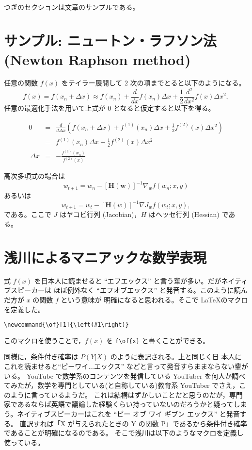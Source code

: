 ﻿\documentclass[uplatex,10pt,a4paper]{jsarticle}
\newcommand{\mb}[1]{\mathbf{#1}}
\newcommand{\of}[1]{\left(#1\right)}
\newcommand{\given}[1]{\left|{#1}\right.}
\newcommand{\Brc}[1]{\left(#1\right)}
\newcommand{\BRc}[1]{\left[{#1}\right]}
\begin{document}
つぎのセクションは文章のサンプルである。

\section{サンプル: ニュートン・ラフソン法 (Newton Raphson method)}
任意の関数 $f\of{x}$ をテイラー展開して $2$ 次の項までとると以下のようになる。
\begin{equation}
f\of{x}=f\of{x_n+\Delta x}\approx f\of{x_n} +\frac{d}{dx}f\of{x_n}\Delta x+\frac{1}{2}\frac{d^2}{dx^2}f\of{x}\Delta x^2,
\end{equation}
任意の最適化手法を用いて上式が $0$ となると仮定すると以下を得る。

\begin{eqnarray}
0&=&\frac{d}{d\Delta x}\Brc{f\of{x_n+\Delta x}+f^{(1)}\of{x_n}\Delta x +\frac{1}{2}f^{(2)}\of{x}\Delta x^2}\\
&=&f^{(1)}\of{x_n}\Delta x +\frac{1}{2}f^{(2)}\of{x}\Delta x^2\\\
\Delta x &=& - \frac{f^{(1)}\of{x_n}}{f^{(2)}\of{x}}
\end{eqnarray}

高次多項式の場合は
\begin{equation}
w_{t+1} = w_{n} - \BRc{\mb{H}\of{\mb{w}}}^{-1}\nabla_wf\of{w_n;x,y}
\end{equation}
あるいは
\begin{equation}
w_{t+1}=w_{t}-\BRc{\mb{H}\of{w}}^{-1}\nabla J_{w}f\of{w_{t};x,y},
\end{equation}
である。ここで $J$ はヤコビ行列 (Jacobian)，$H$ はヘッセ行列 (Hessian) である。

\section{浅川によるマニアックな数学表現}

式 $f\of{x}$ を日本人に読ませると ``エフエックス'' と言う輩が多い。だがネイティブスピーカーは
ほぼ例外なく ``エフオブエックス'' と発音する。このように読んだ方が $x$ の関数 $f$ という意味が
明確になると思われる。そこで \LaTeX のマクロを定義した。

\verb|\newcommand{\of}[1]{\left(#1\right)}|

このマクロを使うことで，$f\of{x}$ を \verb|f\of{x}| と書くことができる。

同様に，条件付き確率は $P\of{Y\given{X}}$ のように表記される。上と同じく日
本人にこれを読ませると``ピーワイ...エックス'' などと言って発音すらままならない輩がいる。
YouTube で数学系のコンテンツを発信している YouTuber を何人か調べてみたが，数学を専門としている(と自称している)教育系 YouTuber でさえ，このように言っているようだ。
これは結構はずかしいことだと思うのだが，専門家であるならば英語で議論した経験くらい持っていないのだろうかと疑ってしまう。ネイティブスピーカーはこれを ``ピー オブ ワイ ギブン エックス'' と発音する。
直訳すれば「X が与えられたときの Y の関数 P」であるから条件付き確率であることが明確になるのである。
そこで浅川は以下のようなマクロを定義し使っている。
\end{document}
